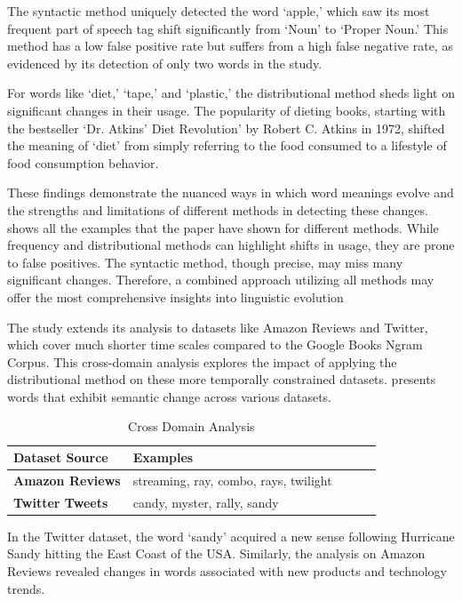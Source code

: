 The syntactic method uniquely detected the word `apple,' which saw its most frequent part of speech tag shift significantly from `Noun' to `Proper Noun.'
This method has a low false positive rate but suffers from a high false negative rate, as evidenced by its detection of only two words in the study.

For words like `diet,' `tape,' and `plastic,' the distributional method sheds light on significant changes in their usage.
The popularity of dieting books, starting with the bestseller `Dr. Atkins’ Diet Revolution' by Robert C. Atkins in 1972, shifted the meaning of `diet' from simply referring to the food consumed to a lifestyle of food consumption behavior.

These findings demonstrate the nuanced ways in which word meanings evolve and the strengths and limitations of different methods in detecting these changes.
 shows all the examples that the paper have shown for different methods.
While frequency and distributional methods can highlight shifts in usage, they are prone to false positives.
The syntactic method, though precise, may miss many significant changes.
Therefore, a combined approach utilizing all methods may offer the most comprehensive insights into linguistic evolution

The study extends its analysis to datasets like Amazon Reviews and Twitter, which cover much shorter time scales compared to the Google Books Ngram Corpus.
This cross-domain analysis explores the impact of applying the distributional method on these more temporally constrained datasets.
 presents words that exhibit semantic change across various datasets.

\begin{table}[tbh]
\begin{tabular}{@{}lllll@{}}
\toprule
\textbf{Dataset Source} & \textbf{Examples}                     &  &  &  \\ \midrule
\textbf{Amazon Reviews} & streaming, ray, combo, rays, twilight &  &  &  \\
\textbf{Twitter Tweets} & candy, myster, rally, sandy           &  &  &  \\ \bottomrule
\end{tabular}
\caption{Cross Domain Analysis}
\label{tab:sources-examples}
\end{table}
\raggedbottom

In the Twitter dataset, the word `sandy' acquired a new sense following Hurricane Sandy hitting the East Coast of the USA\@.
Similarly, the analysis on Amazon Reviews revealed changes in words associated with new products and technology trends.

